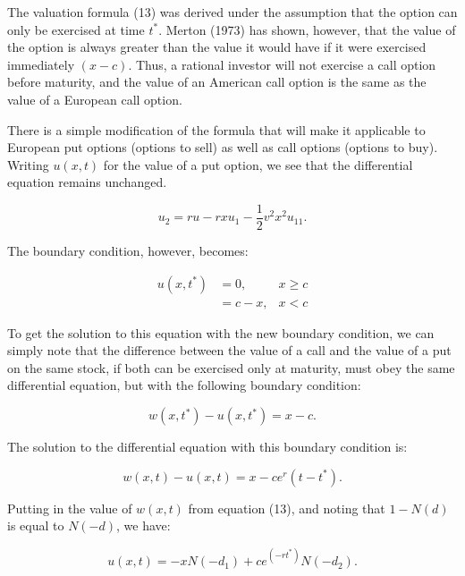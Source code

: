 \documentclass[a4paper, 12pt, twoside]{article}
\begin{document}
The valuation formula (13) was derived under the assumption that the option can only 
be exercised at time $t^*$. Merton (1973) has shown, however, that the value of the 
option is always greater than the value it would have if it were exercised immediately 
$(x-c)$.  Thus, a rational investor will not exercise a call option before maturity, and 
the value of an American call option is the same as the value of a European call    
option.

There is a simple modification of the formula that will make it applicable to European 
put options (options to sell) as well as call options (options to buy). Writing $u(x,t)$ 
for the value of a put option, we see that the differential equation remains 
unchanged.

\begin{equation}
u_2=ru-rxu_1- \frac{1}{2} v^2 x^2 u_{11}.
\end{equation}

\vspace*{3mm}
The boundary condition, however, becomes:

\begin{equation}
\begin{array}{rll}
u(x,t^*) &=0, &x \ge c \\
         &=c-x,   &x < c
\end{array} 
\end{equation}

To get the solution to this equation with the new boundary condition, we can simply 
note that the difference between the value of a call and the value of a put on the 
same stock, if both can be exercised only at maturity, must obey the same differential 
equation, but with the following boundary condition:

\begin{equation}
w(x,t^*)-u(x,t^*)=x-c.
\end{equation}

The solution to the differential equation with this boundary condition is:

\begin{equation}
w(x,t)-u(x,t)=x-ce^r(t-t^*).
\end{equation}

Putting in the value of $w(x,t)$ from equation (13), and noting that $1-N(d)$ is equal to 
$N(-d)$, we have:

\begin{equation}
u(x,t)=-xN(-d_1)+ce^(-rt^*) N(-d_2).
\end{equation}
\end{document}
